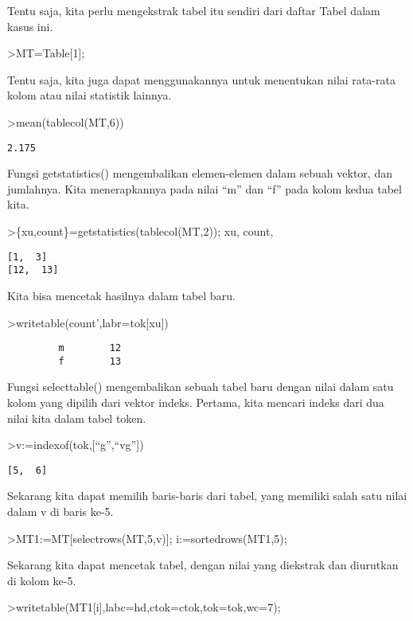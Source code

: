 \documentclass[
]{book}
\begin{document}
Tentu saja, kita perlu mengekstrak tabel itu sendiri dari daftar Tabel dalam kasus ini.

\textgreater MT=Table{[}1{]};

Tentu saja, kita juga dapat menggunakannya untuk menentukan nilai rata-rata kolom atau nilai statistik lainnya.

\textgreater mean(tablecol(MT,6))

\begin{verbatim}
2.175
\end{verbatim}

Fungsi getstatistics() mengembalikan elemen-elemen dalam sebuah vektor, dan jumlahnya. Kita menerapkannya pada nilai ``m'' dan ``f'' pada kolom kedua tabel kita.

\textgreater\{xu,count\}=getstatistics(tablecol(MT,2)); xu, count,

\begin{verbatim}
[1,  3]
[12,  13]
\end{verbatim}

Kita bisa mencetak hasilnya dalam tabel baru.

\textgreater writetable(count',labr=tok{[}xu{]})

\begin{verbatim}
         m        12
         f        13
\end{verbatim}

Fungsi selecttable() mengembalikan sebuah tabel baru dengan nilai dalam satu kolom yang dipilih dari vektor indeks. Pertama, kita mencari indeks dari dua nilai kita dalam tabel token.

\textgreater v:=indexof(tok,{[}``g'',``vg''{]})

\begin{verbatim}
[5,  6]
\end{verbatim}

Sekarang kita dapat memilih baris-baris dari tabel, yang memiliki salah satu nilai dalam v di baris ke-5.

\textgreater MT1:=MT{[}selectrows(MT,5,v){]}; i:=sortedrows(MT1,5);

Sekarang kita dapat mencetak tabel, dengan nilai yang diekstrak dan diurutkan di kolom ke-5.

\textgreater writetable(MT1{[}i{]},labc=hd,ctok=ctok,tok=tok,wc=7);
\end{document}
